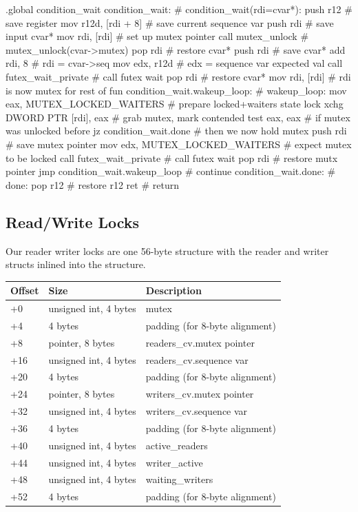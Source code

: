 \begin{asm}
.global condition_wait
condition_wait:				    # condition_wait(rdi=cvar*):
	push	r12			    #   save register
	mov	r12d, [rdi + 8]		    #   save current sequence var
	push	rdi			    #   save input cvar*
	mov	rdi, [rdi]		    #   set up mutex pointer
	call	mutex_unlock		    #   mutex_unlock(cvar->mutex)
	pop	rdi			    #   restore cvar*
	push	rdi			    #   save cvar*
	add	rdi, 8			    #   rdi = cvar->seq
	mov	edx, r12d		    #   edx = sequence var expected val
	call	futex_wait_private	    #   call futex wait
	pop	rdi			    #   restore cvar*
	mov	rdi, [rdi]		    #   rdi is now mutex for rest of fun
condition_wait.wakeup_loop:		    # wakeup_loop:
	mov	eax, MUTEX_LOCKED_WAITERS   #   prepare locked+waiters state
	lock xchg DWORD PTR [rdi], eax	    #   grab mutex, mark contended
	test	eax, eax		    #   if mutex was unlocked before
	jz	condition_wait.done	    #   then we now hold mutex
	push	rdi			    #   save mutex pointer
	mov	edx, MUTEX_LOCKED_WAITERS   #   expect mutex to be locked
	call	futex_wait_private	    #   call futex wait
	pop	rdi			    #   restore mutx pointer
	jmp	condition_wait.wakeup_loop  #   continue
condition_wait.done:			    # done:
	pop	r12			    #   restore r12
	ret				    #   return
\end{asm}

\subsection{Read/Write Locks}

Our reader writer locks are one 56-byte structure with the reader and writer
structs inlined into the structure.

\begin{table}[h]
\begin{tabular}{|l|l|l|}\hline
Offset & Size & Description \\\hline
+0   & unsigned int, 4 bytes & mutex \\
+4   & 4 bytes & padding (for 8-byte alignment) \\
+8   & pointer, 8 bytes & readers\_cv.mutex pointer \\
+16  & unsigned int, 4 bytes & readers\_cv.sequence var \\
+20  & 4 bytes & padding (for 8-byte alignment) \\
+24  & pointer, 8 bytes & writers\_cv.mutex pointer \\
+32  & unsigned int, 4 bytes & writers\_cv.sequence var \\
+36  & 4 bytes & padding (for 8-byte alignment) \\
+40  & unsigned int, 4 bytes & active\_readers \\
+44  & unsigned int, 4 bytes & writer\_active \\
+48  & unsigned int, 4 bytes & waiting\_writers \\
+52  & 4 bytes & padding (for 8-byte alignment) \\\hline
\end{tabular}
\end{table}

